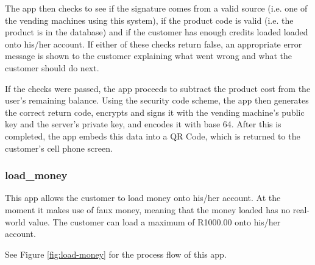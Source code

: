 The app then checks to see if the signature comes from a valid source (i.e. one of the vending
machines using this system), if the product code is valid (i.e. the product is in the database)
and if the customer has enough credits loaded loaded onto his/her account. If either of these
checks return false, an appropriate error message is shown to the customer explaining what
went wrong and what the customer should do next.

If the checks were passed, the app proceeds to subtract the product cost from the user's
remaining balance. Using the security code scheme, the app then generates the correct return
code, encrypts and signs it with the vending machine's public key and the server's private key,
and encodes it with base 64. After this is completed, the app embeds this data into a QR Code,
which is returned to the customer's cell phone screen. 

\subsubsection{load\_money}

This app allows the customer to load money onto his/her account. At the moment it makes use of
faux money, meaning that the money loaded has no real-world value. The customer can load a
maximum of R1000.00 onto his/her account.

See Figure \ref{fig:load-money} for the process flow of this app.

